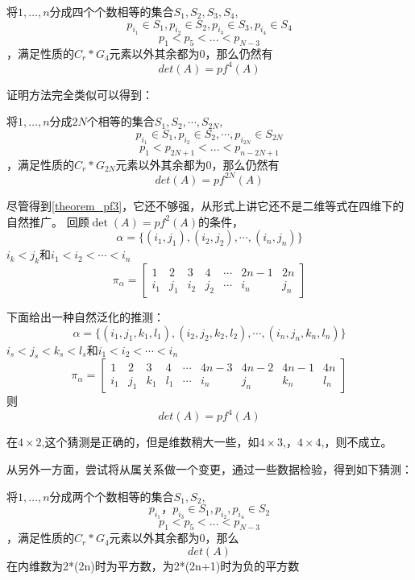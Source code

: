 \documentclass{amsc}          %
\numberwithin{equation}{section} %
\begin{document}
\begin{theorem}\label{theorem_pf3}
将$1, \dots, n$分成四个个数相等的集合$S_{1},S_{2},S_{3},S_{4}$,
\begin{equation}p_{i_{1}} \in S_{1}, p_{i_{2}} \in S_{2}, p_{i_{3}} \in S_{3}, p_{i_{4}} \in S_{4}\end{equation}
\begin{equation}\label{bb}p_{1}<p_{5}<...<p_{N-3}\end{equation}，满足性质的$C_{r}*G_{4}$元素以外其余都为0，那么仍然有$$det(A)=pf^{4}(A)$$
\end{theorem}
证明方法完全类似可以得到：
\begin{theorem}\label{theorem_pf4}
将$1, \dots, n$分成$2N$个相等的集合$S_{1},S_{2},\cdots,S_{2N}$,
\begin{equation}p_{i_{1}} \in S_{1}, p_{i_{2}} \in S_{2}, \cdots, p_{i_{2N}} \in S_{2N}\end{equation}
\begin{equation}\label{bb}p_{1}<p_{2N+1}<...<p_{n-2N+1}\end{equation}，满足性质的$C_{r}*G_{2N}$元素以外其余都为0，那么仍然有$$det(A)=pf^{2N}(A)$$
\end{theorem}

尽管得到\ref{theorem_pf3}，它还不够强，从形式上讲它还不是二维等式在四维下的自然推广。
回顾$\det(A)=pf^{2}(A)$的条件，
$$\alpha =\{(i_{1},j_{1}),(i_{2},j_{2}),\cdots ,(i_{n},j_{n})\}$$
$i_{k}<j_{k}$和$i_{1}<i_{2}<\cdots <i_{n}$
$${\displaystyle \pi _{\alpha }={\begin{bmatrix}1&2&3&4&\cdots &2n-1&2n\\i_{1}&j_{1}&i_{2}&j_{2}&\cdots &i_{n}&j_{n}\end{bmatrix}}}$$

下面给出一种自然泛化的推测：
$$\alpha =\{(i_{1},j_{1},k_{1},l_{1}),(i_{2},j_{2},k_{2},l_{2}),\cdots ,(i_{n},j_{n},k_{n},l_{n})\}$$
$i_{s}<j_{s}<k_{s}<l_{s}$和$i_{1}<i_{2}<\cdots <i_{n}$
$${\displaystyle \pi _{\alpha }={\begin{bmatrix}1&2&3&4&\cdots &4n-3&4n-2&4n-1&4n\\i_{1}&j_{1}&k_{1}&l_{1}&\cdots &i_{n}&j_{n}&k_{n}&l_{n}\end{bmatrix}}}$$
则
$$det(A)=pf^{4}(A)$$



在$4 \times 2$,\cite{VAL42}这个猜测是正确的，但是维数稍大一些，如$4 \times 3$,\cite{VAL34}，$4 \times 4$,\cite{VAL44}，则不成立。

从另外一方面，尝试将从属关系做一个变更，通过一些数据检验，得到如下猜测：
\begin{question}\label{guess_pf1}
将$1, \dots, n$分成两个个数相等的集合$S_{1},S_{2}$,
\begin{equation}p_{i_{1}} ， p_{i_{3}} \in S_{1}, p_{i_{2}}, p_{i_{4}} \in S_{2}\end{equation}
\begin{equation}\label{bb}p_{1}<p_{5}<...<p_{N-3}\end{equation}，满足性质的$C_{r}*G_{4}$元素以外其余都为0，那么$$det(A)$$在内维数为2*(2n)时为平方数，为2*(2n+1)时为负的平方数
\end{question}
\end{document}
